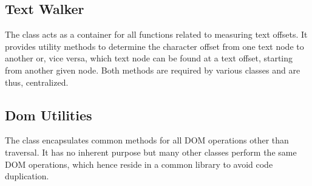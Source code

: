 





\subsection{Text Walker}

The  class acts as a container for all functions related to measuring text offsets. It provides utility methods to determine the character offset from one text node to another or, vice versa, which text node can be found at a text offset, starting from another given node. Both methods are required by various classes and are thus, centralized. 

\subsection{Dom Utilities}

The  class encapsulates common methods for all DOM operations other than traversal. It has no inherent purpose but many other classes perform the same DOM operations, which hence reside in a common library to avoid code duplication.

